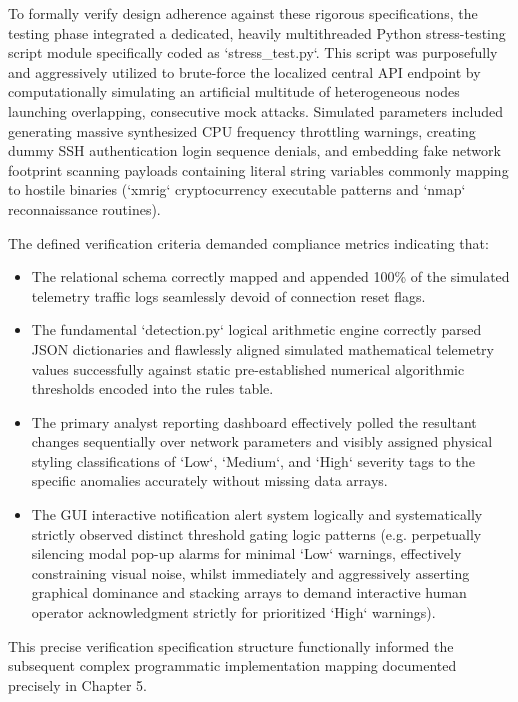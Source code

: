 To formally verify design adherence against these rigorous specifications, the testing phase integrated a dedicated, heavily multithreaded Python stress-testing script module specifically coded as `stress\_test.py`. This script was purposefully and aggressively utilized to brute-force the localized central API endpoint by computationally simulating an artificial multitude of heterogeneous nodes launching overlapping, consecutive mock attacks. Simulated parameters included generating massive synthesized CPU frequency throttling warnings, creating dummy SSH authentication login sequence denials, and embedding fake network footprint scanning payloads containing literal string variables commonly mapping to hostile binaries (`xmrig` cryptocurrency executable patterns and `nmap` reconnaissance routines). 

The defined verification criteria demanded compliance metrics indicating that:
\begin{itemize}
    \item The relational schema correctly mapped and appended 100\% of the simulated telemetry traffic logs seamlessly devoid of connection reset flags.
    \item The fundamental `detection.py` logical arithmetic engine correctly parsed JSON dictionaries and flawlessly aligned simulated mathematical telemetry values successfully against static pre-established numerical algorithmic thresholds encoded into the rules table.
    \item The primary analyst reporting dashboard effectively polled the resultant changes sequentially over network parameters and visibly assigned physical styling classifications of `Low`, `Medium`, and `High` severity tags to the specific anomalies accurately without missing data arrays. 
    \item The GUI interactive notification alert system logically and systematically strictly observed distinct threshold gating logic patterns (e.g. perpetually silencing modal pop-up alarms for minimal `Low` warnings, effectively constraining visual noise, whilst immediately and aggressively asserting graphical dominance and stacking arrays to demand interactive human operator acknowledgment strictly for prioritized `High` warnings).
\end{itemize}
This precise verification specification structure functionally informed the subsequent complex programmatic implementation mapping documented precisely in Chapter 5.

